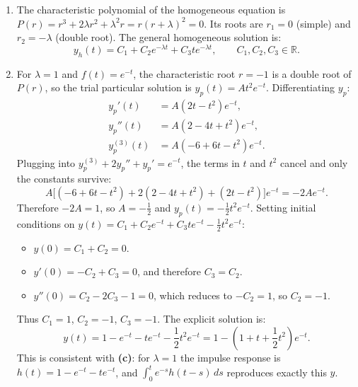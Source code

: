 \begin{exercisesolution}
\begin{enumerate}[label=\textbf{(\alph*)}]
  \item The characteristic polynomial of the homogeneous equation is $P(r) = r^3 + 2\lambda r^2 + \lambda^2 r = r(r+\lambda)^2 = 0$. Its roots are $r_1 = 0$ (simple) and $r_2 = -\lambda$ (double root). The general homogeneous solution is:
\[y_h(t) = C_1 + C_2 e^{-\lambda t} + C_3 t e^{-\lambda t}, \qquad C_1, C_2, C_3 \in \mathbb{R}.\]

  \item For $\lambda = 1$ and $f(t) = e^{-t}$, the characteristic root $r = -1$ is a double root of $P(r)$, so the trial particular solution is $y_p(t) = A t^2 e^{-t}$.
Differentiating $y_p$:
\begin{align*}
y_p'(t) &= A (2t - t^2) e^{-t}, \\
y_p''(t) &= A (2 - 4t + t^2) e^{-t}, \\
y_p^{(3)}(t) &= A (-6 + 6t - t^2) e^{-t}.
\end{align*}
Plugging into $y_p^{(3)} + 2y_p'' + y_p' = e^{-t}$, the terms in $t$ and $t^2$ cancel and only the
constants survive:
\[A \Big[(-6+6t-t^2) + 2(2-4t+t^2) + (2t-t^2)\Big] e^{-t} = -2A e^{-t}.\]
Therefore $-2A = 1$, so $A = -\tfrac{1}{2}$ and $y_p(t) = -\tfrac{1}{2} t^2 e^{-t}$.
Setting initial conditions on $y(t) = C_1 + C_2 e^{-t} + C_3 t e^{-t} - \frac{1}{2} t^2 e^{-t}$:
\begin{itemize}
  \item $y(0) = C_1 + C_2 = 0$.
  \item $y'(0) = -C_2 + C_3 = 0$, and therefore $C_3 = C_2$.
  \item $y''(0) = C_2 - 2C_3 - 1 = 0$, which reduces to $-C_2 = 1$, so $C_2 = -1$.
\end{itemize}
Thus $C_1 = 1$, $C_2 = -1$, $C_3 = -1$. The explicit solution is:
\[y(t) = 1 - e^{-t} - t e^{-t} - \frac{1}{2} t^2 e^{-t} = 1 - \left(1 + t + \frac{1}{2} t^2\right) e^{-t}.\]
This is consistent with \textbf{(c)}: for $\lambda = 1$ the impulse response is
$h(t) = 1 - e^{-t} - te^{-t}$, and $\int_0^t e^{-s} h(t-s) \, ds$ reproduces exactly this $y$.


\end{enumerate}
\end{exercisesolution}
